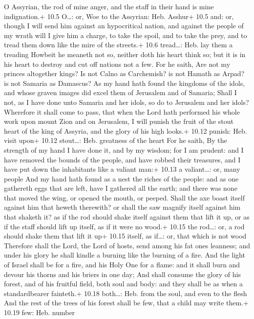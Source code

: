  O Assyrian, the rod of mine anger, and the staff in their
hand is mine indignation.+ 10.5 O\ldots: or, Woe to the Assyrian: Heb.
Asshur+ 10.5 and: or, though  I will send him against an
hypocritical nation, and against the people of my wrath will I give him
a charge, to take the spoil, and to take the prey, and to tread them
down like the mire of the streets.+ 10.6 tread\ldots: Heb. lay them a
treading  Howbeit he meaneth not so, neither doth his heart
think so; but it is in his heart to destroy and cut off nations not a
few.  For he saith, Are not my princes altogether kings?
 Is not Calno as Carchemish? is not Hamath as Arpad? is not
Samaria as Damascus?  As my hand hath found the kingdoms of
the idols, and whose graven images did excel them of Jerusalem and of
Samaria;  Shall I not, as I have done unto Samaria and her
idols, so do to Jerusalem and her idols?  Wherefore it
shall come to pass, that when the Lord hath performed his whole work
upon mount Zion and on Jerusalem, I will punish the fruit of the stout
heart of the king of Assyria, and the glory of his high looks.+ 10.12
punish: Heb. visit upon+ 10.12 stout\ldots: Heb. greatness of the heart
 For he saith, By the strength of my hand I have done it,
and by my wisdom; for I am prudent: and I have removed the bounds of the
people, and have robbed their treasures, and I have put down the
inhabitants like a valiant man:+ 10.13 a valiant\ldots: or, many people
 And my hand hath found as a nest the riches of the people:
and as one gathereth eggs that are left, have I gathered all the earth;
and there was none that moved the wing, or opened the mouth, or peeped.
 Shall the axe boast itself against him that heweth
therewith? or shall the saw magnify itself against him that shaketh it?
as if the rod should shake itself against them that lift it up, or as if
the staff should lift up itself, as if it were no wood.+ 10.15 the
rod\ldots: or, a rod should shake them that lift it up+ 10.15 itself, as
if\ldots: or, that which is not wood  Therefore shall the
Lord, the Lord of hosts, send among his fat ones leanness; and under his
glory he shall kindle a burning like the burning of a fire.
 And the light of Israel shall be for a fire, and his Holy
One for a flame: and it shall burn and devour his thorns and his briers
in one day;  And shall consume the glory of his forest, and
of his fruitful field, both soul and body: and they shall be as when a
standardbearer fainteth.+ 10.18 both\ldots: Heb. from the soul, and even
to the flesh  And the rest of the trees of his forest shall
be few, that a child may write them.+ 10.19 few: Heb. number

